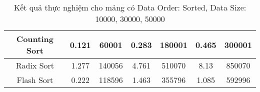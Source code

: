 \begin{table}[H]
{\begin{tabular}{|ccccccc|}
\multicolumn{1}{|c|}{Counting Sort} & \multicolumn{1}{c|}{0.121} & \multicolumn{1}{c|}{60001} & \multicolumn{1}{c|}{0.283} & \multicolumn{1}{c|}{180001} & \multicolumn{1}{c|}{0.465} & \multicolumn{1}{c|}{300001} \\ \hline
\multicolumn{1}{|c|}{Radix Sort} & \multicolumn{1}{c|}{1.277} & \multicolumn{1}{c|}{140056} & \multicolumn{1}{c|}{4.761} & \multicolumn{1}{c|}{510070} & \multicolumn{1}{c|}{8.13} & \multicolumn{1}{c|}{850070} \\ \hline
\multicolumn{1}{|c|}{Flash Sort} & \multicolumn{1}{c|}{0.222} & \multicolumn{1}{c|}{118596} & \multicolumn{1}{c|}{1.463} & \multicolumn{1}{c|}{355796} & \multicolumn{1}{c|}{1.085} & \multicolumn{1}{c|}{592996} \\ \hline
\end{tabular}%
}
\caption{Kết quả thực nghiệm cho mảng có Data Order: Sorted, Data Size: 10000, 30000, 50000}
\label{tab:sorted_10000_30000_50000}
\end{table}

